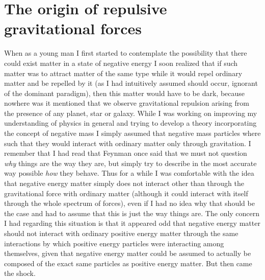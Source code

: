 \documentclass[notitlepage,12pt]{report}
\begin{document}
\section{The origin of repulsive gravitational forces}

When as a young man I first started to contemplate the possibility that there could exist matter in a state of negative energy I soon realized that if such matter was to attract matter of the same type while it would repel ordinary matter and be repelled by it (as I had intuitively assumed should occur, ignorant of the dominant paradigm), then this matter would have to be dark, because nowhere was it mentioned that we observe gravitational repulsion arising from the presence of any planet, star or galaxy. While I was working on improving my understanding of physics in general and trying to develop a theory incorporating the concept of negative mass I simply assumed that negative mass particles where such that they would interact with ordinary matter only through gravitation. I remember that I had read that Feynman once said that we must not question \textit{why} things are the way they are, but simply try to describe in the most accurate way possible \textit{how} they behave. Thus for a while I was comfortable with the idea that negative energy matter simply does not interact other than through the gravitational force with ordinary matter (although it could interact with itself through the whole spectrum of forces), even if I had no idea why that should be the case and had to assume that this is just the way things are. The only concern I had regarding this situation is that it appeared odd that negative energy matter should not interact with ordinary positive energy matter through the same interactions by which positive energy particles were interacting among themselves, given that negative energy matter could be assumed to actually be composed of the exact same particles as positive energy matter. But then came the shock.
\end{document}
